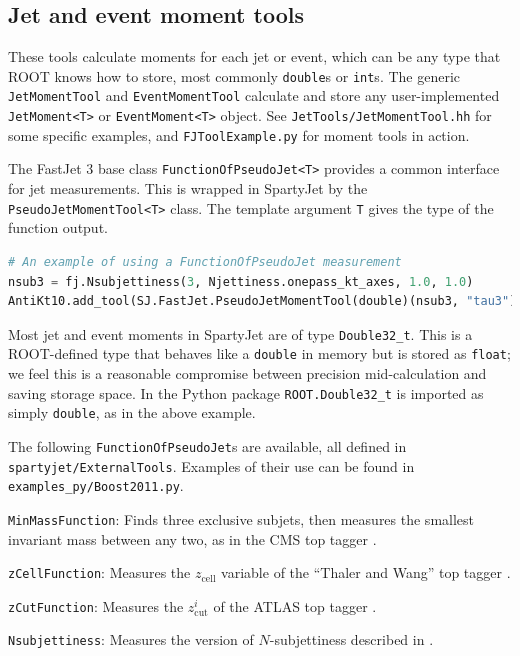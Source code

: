\documentclass{article}
\newcommand{\prog}[1]{{\sc #1}\xspace}
\newcommand{\code}[1]{{\tt #1}\xspace}
\newcommand{\codes}[1]{{\tt #1}s\xspace}
\newcommand{\SJ}[0]{\prog{SpartyJet}}
\newcommand{\FJ}[0]{\prog{FastJet}}
\begin{document}
\subsection{Jet and event moment tools}

These tools calculate moments for each jet or event, which can be any type that ROOT knows how to store, most commonly \codes{double} or \codes{int}.  The generic \code{JetMomentTool} and \code{EventMomentTool} calculate and store any user-implemented \code{JetMoment<T>} or \code{EventMoment<T>} object.  See \verb+JetTools/JetMomentTool.hh+ for some specific examples, and \verb+FJToolExample.py+ for moment tools in action.

The \FJ 3 base class \code{FunctionOfPseudoJet<T>} provides a common interface for jet measurements.  This is wrapped in \SJ by the \code{PseudoJetMomentTool<T>} class.  The template argument \code{T} gives the type of the function output.

\begin{lstlisting}[language=Python]
# An example of using a FunctionOfPseudoJet measurement
nsub3 = fj.Nsubjettiness(3, Njettiness.onepass_kt_axes, 1.0, 1.0)
AntiKt10.add_tool(SJ.FastJet.PseudoJetMomentTool(double)(nsub3, "tau3"))
\end{lstlisting}

Most jet and event moments in \SJ are of type \code{Double32\_t}.  This is a \prog{ROOT}-defined type that behaves like a \code{double} in memory but is stored as \code{float}; we feel this is a reasonable compromise between precision mid-calculation and saving storage space.  In the Python package \code{ROOT.Double32\_t} is imported as simply \code{double}, as in the above example.

The following \codes{FunctionOfPseudoJet} are available, all defined in \verb+spartyjet/ExternalTools+.  Examples of their use can be found in \verb+examples_py/Boost2011.py+.

\begin{description}
\item \code{MinMassFunction}: Finds three exclusive subjets, then measures the smallest invariant mass between any two, as in the CMS top tagger \cite{CMS1,CMS2}.
\item \code{zCellFunction}: Measures the $z_\text{cell}$ variable of the ``Thaler and Wang'' top tagger \cite{ThalerWang}.
\item \code{zCutFunction}: Measures the $z_\text{cut}^i$ of the ATLAS top tagger \cite{ATLAS}.
\item \code{Nsubjettiness}: Measures the version of $N$-subjettiness described in \cite{NSub}.
\end{description}
\end{document}
